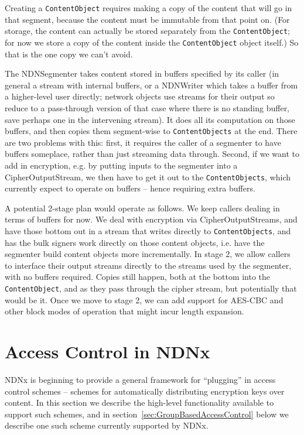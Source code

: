 Creating a {\tt ContentObject} requires making a copy of the content
that will go in that segment, because the content must be immutable
from that point on. (For storage, the content can actually be stored
separately from the {\tt ContentObject}; for now we store a copy of
the content inside the {\tt ContentObject} object itself.) So that is
the one copy we can't avoid.

The NDNSegmenter takes content stored in buffers specified by its
caller (in general a stream with internal buffers, or a NDNWriter
which takes a buffer from a higher-level user directly; network
objects use streams for their output so reduce to a pass-through
version of that case where there is no standing buffer, save perhaps
one in the intervening stream). It does all its computation on those
buffers, and then copies them segment-wise to {\tt ContentObjects} at
the end. There are two problems with this: first, it requires the
caller of a segmenter to have buffers someplace, rather than just
streaming data through. Second, if we want to add in encryption,
e.g. by putting inputs to the segmenter into a CipherOutputStream, we
then have to get it out to the {\tt ContentObjects}, which currently
expect to operate on buffers -- hence requiring extra buffers.

A potential 2-stage plan would operate as follows. We keep callers
dealing in terms of buffers for now. We deal with encryption via
CipherOutputStreams, and have those bottom out in a stream that writes
directly to {\tt ContentObjects}, and has the bulk signers work
directly on those content objects, i.e. have the segmenter build
content objects more incrementally. In stage 2, we allow callers to
interface their output streams directly to the streams used by the
segmenter, with no buffers required. Copies still happen, both at the
bottom into the {\tt ContentObject}, and as they pass through the
cipher stream, but potentially that would be it. Once we move to stage
2, we can add support for AES-CBC and other block modes of operation
that might incur length expansion.

\newpage


\section{Access Control in NDNx}
\label{sec:AccessControl}

NDNx is beginning to provide a general framework for ``plugging'' in
access control schemes -- schemes for automatically distributing
encryption keys over content. In this section we describe the
high-level functionality available to support such schemes, and in
section~\ref{sec:GroupBasedAccessControl} below we describe one such
scheme currently supported by NDNx.

